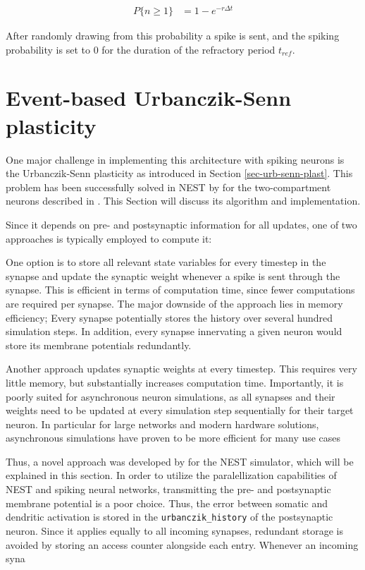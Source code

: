 \begin{align}
  P\{ \textit{n} \geq 1\} & = 1 - e^{-r \Delta t}
\end{align}


After randomly drawing from this probability a spike is sent, and the spiking probability is set to 0 for the duration
of the refractory period $t_{ref}$.

\section{Event-based Urbanczik-Senn plasticity}\label{sec-event-urb}

One major challenge in implementing this architecture with spiking neurons is the Urbanczik-Senn plasticity as
introduced in Section \ref{sec-urb-senn-plast}. This problem has been successfully solved in NEST by
\cite{Stapmanns2021} for the two-compartment neurons described in \cite{urbanczik2014learning}. This Section will
discuss its algorithm and implementation.

Since it depends on pre- and postsynaptic information for all updates, one of two approaches is typically employed to
compute it:

One option is to store all relevant state variables for every timestep in the synapse and update the synaptic weight
whenever a spike is sent through the synapse. This is efficient in terms of computation time, since fewer computations
are required per synapse. The major downside of the approach lies in memory efficiency; Every synapse potentially stores
the history over several hundred simulation steps. In addition, every synapse innervating a given neuron would store its
membrane potentials redundantly.

Another approach updates synaptic weights at every timestep. This requires very little memory, but substantially
increases computation time. Importantly, it is poorly suited for asynchronous neuron simulations, as all synapses and
their weights need to be updated at every simulation step sequentially for their target neuron. In particular for large
networks and modern hardware solutions, asynchronous simulations have proven to be more efficient for many use cases

Thus, a novel approach was developed by \cite{Stapmanns2021} for the NEST simulator, which will be explained in this
section. In order to utilize the paralellization capabilities of NEST and spiking neural networks, transmitting the pre-
and postsynaptic membrane potential is a poor choice. Thus, the error between somatic and dendritic activation is stored
in the \texttt{urbanczik\_history} of the postsynaptic neuron. Since it applies equally to all incoming synapses,
redundant storage is avoided by storing an access counter alongside each entry. Whenever an incoming syna



